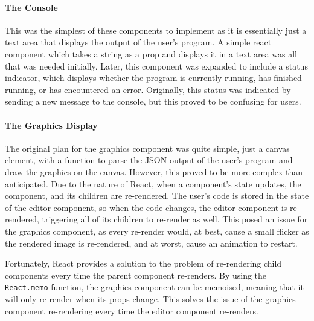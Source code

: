 \documentclass[../main.tex]{subfiles}
\begin{document}
                \paragraph{The Console}
                    This was the simplest of these components to implement as it is essentially
                        just a text area that displays the output of the user's program.
                    A simple react component which takes a string as a prop and displays it in a
                        text area was all that was needed initially.
                    Later, this component was expanded to include a status indicator, which
                        displays whether the program is currently running, has finished running, or has
                        encountered an error.
                    Originally, this status was indicated by sending a new message to the console,
                        but this proved to be confusing for users.

                \paragraph{The Graphics Display}
                    The original plan for the graphics component was quite simple, just a canvas
                        element, with a function to parse the JSON output of the user's program and
                        draw the graphics on the canvas.
                    However, this proved to be more complex than anticipated.
                    Due to the nature of React, when a component's state updates, the component,
                        and its children are re-rendered.
                    The user's code is stored in the state of the editor component, so when the
                        code changes, the editor component is re-rendered, triggering all of its
                        children to re-render as well.
                    This posed an issue for the graphics component, as every re-render would, at
                        best, cause a small flicker as the rendered image is re-rendered, and at worst,
                        cause an animation to restart.

                    Fortunately, React provides a solution to the problem of re-rendering child
                        components every time the parent component re-renders.
                    By using the \texttt{React.memo} function, the graphics component can be
                        memoised, meaning that it will only re-render when its props change.
                    This solves the issue of the graphics component re-rendering every time the
                        editor component re-renders.
\end{document}
